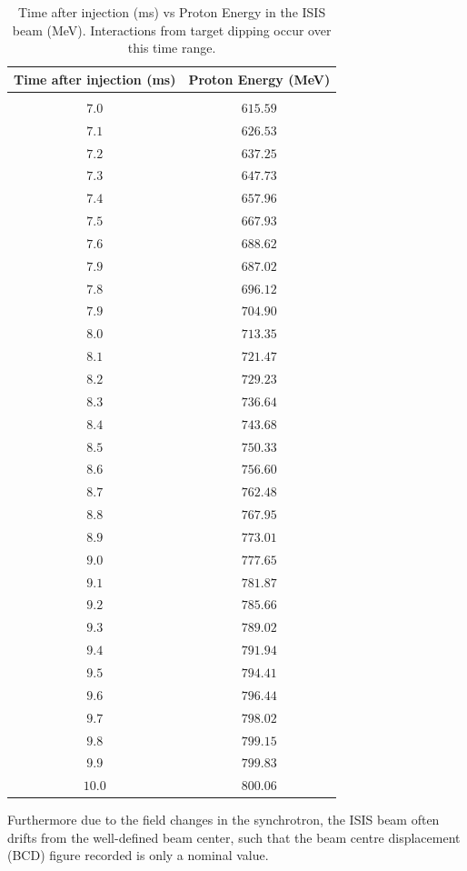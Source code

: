 \documentclass[a4paper,11pt]{article}
\begin{document}
\begin{table}
\centering
\begin{tabular}{ c c }
\hline Time after injection (ms) & Proton Energy (MeV) \\
\hline \vspace{-2.5mm} \\
$7.0$ & $615.59$ \\ \hline
$7.1$ & $626.53$ \\
$7.2$ & $637.25$ \\
$7.3$ & $647.73$ \\
$7.4$ & $657.96$ \\
$7.5$ & $667.93$ \\
$7.6$ & $688.62$ \\
$7.9$ & $687.02$ \\
$7.8$ & $696.12$ \\
$7.9$ & $704.90$ \\ \hline
$8.0$ & $713.35$ \\ \hline
$8.1$ & $721.47$ \\
$8.2$ & $729.23$ \\
$8.3$ & $736.64$ \\
$8.4$ & $743.68$ \\
$8.5$ & $750.33$ \\
$8.6$ & $756.60$ \\
$8.7$ & $762.48$ \\
$8.8$ & $767.95$ \\
$8.9$ & $773.01$ \\ \hline
$9.0$ & $777.65$ \\ \hline
$9.1$ & $781.87$ \\
$9.2$ & $785.66$ \\
$9.3$ & $789.02$ \\
$9.4$ & $791.94$ \\
$9.5$ & $794.41$ \\
$9.6$ & $796.44$ \\
$9.7$ & $798.02$ \\
$9.8$ & $799.15$ \\
$9.9$ & $799.83$ \\ \hline
$10.0$ & $800.06$ \\
\hline
\end{tabular}
\caption{Time after injection (ms) vs Proton Energy in the ISIS beam (MeV). Interactions from target dipping occur over this time range.}
\end{table}

 Furthermore due to the field changes in the synchrotron, the ISIS beam often drifts from the well-defined beam center, such that the beam centre displacement (BCD) figure recorded is only a nominal value. 
\end{document}
